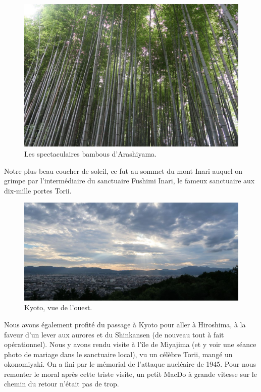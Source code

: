 \begin{figure}
\centering
\includegraphics{images/20180716_bambou.JPG}
\caption{Les spectaculaires bambous d'Arashiyama.}
\end{figure}

Notre plus beau coucher de soleil, ce fut au sommet du mont Inari auquel
on grimpe par l'intermédiaire du sanctuaire Fushimi Inari, le fameux
sanctuaire aux dix-mille portes Torii.

\begin{figure}
\centering
\includegraphics{images/20180716_inari.JPG}
\caption{Kyoto, vue de l'ouest.}
\end{figure}

Nous avons également profité du passage à Kyoto pour aller à Hiroshima,
à la faveur d'un lever aux aurores et du Shinkansen (de nouveau tout à
fait opérationnel). Nous y avons rendu visite à l'île de Miyajima (et y
voir une séance photo de mariage dans le sanctuaire local), vu un
célèbre Torii, mangé un okonomiyaki. On a fini par le mémorial de
l'attaque nucléaire de 1945. Pour nous remonter le moral après cette
triste visite, un petit MacDo à grande vitesse sur le chemin du retour
n'était pas de trop.

